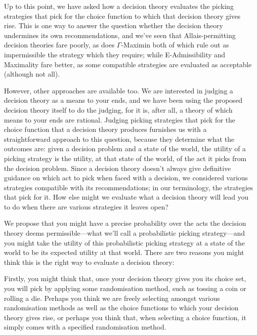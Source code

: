 \documentclass[a4paper,final]{article}
\newcommand{\todoold}[2][]{\todo[backgroundcolor=white,bordercolor=orange!10,linecolor=gray!10, #1,caption={},textcolor=gray]{Pre-rev: #2}}
\newcommand{\todooldinfo}[2][]{\todoold[#1]{#2}}
\newenvironment{CCM rewritten}
{\begingroup\color{blue}} %
{\endgroup}              %
\begin{document}
Up to this point, we have asked how a decision theory evaluates the picking strategies that pick for the choice function to which that decision theory gives rise. This is one way to answer the question whether the decision theory undermines its own recommendations, and we've seen that Allais-permitting decision theories fare poorly, as does $\Gamma$-Maximin both of which rule out as impermissible the strategy which they require; while E-Admissibility and Maximality fare better, as some compatible strategies are evaluated as acceptable (although not all). \todoold{check that}

However, other approaches are available too. We are interested in judging a decision theory as a means to your ends, and we have been using the proposed decision theory itself to do the judging, for it is, after all, a theory of which means to your ends are rational. Judging picking strategies that pick for the choice function that a decision theory produces furnishes us with a straightforward approach to this question, because they determine what the outcomes are: given a decision problem and a state of the world, the utility of a picking strategy is the utility, at that state of the world, of the act it picks from the decision problem. Since a decision theory doesn't always give definitive guidance on which act to pick when faced with a decision, we considered various strategies compatible with its recommendations; in our terminology, the strategies that pick for it. 
How else might we evaluate what a decision theory will lead you to do when there are various strategies %
it leaves open?

We propose that you might have a precise probability over the acts the decision theory deems permissible---what we'll call a probabilistic picking strategy---and you might take the utility of this probabilistic picking strategy at a state of the world to be its expected utility at that world. There are two reasons you might think this is the right way to evaluate a decision theory: 

Firstly, you might think that, once your decision theory gives you its choice set, you will pick by applying some randomisation method, such as tossing a coin or rolling a die. Perhaps you think we are freely selecting amongst various randomisation methods as well as the choice functions to which your decision theory gives rise, or perhaps you think that, when selecting a choice function, it simply comes with a specified randomisation method. %
\end{document}

